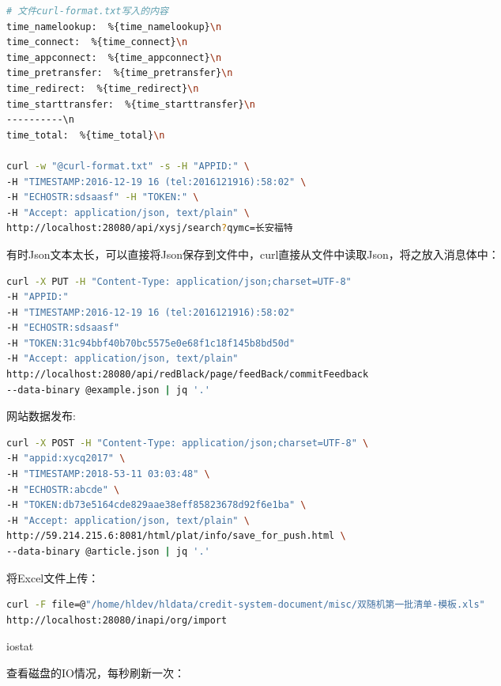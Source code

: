 \documentclass[12pt]{book}
\makeatletter
\numberwithin{dummy}{section}
\theoremstyle{ocrenumbox}
\theoremstyle{blacknumex}
\theoremstyle{blacknumbox}
\theoremstyle{ocrenum}
\renewcommand{\subsection}{\@startsection {subsection}{2}{\z@}
	{-3ex \@plus -0.1ex \@minus -.4ex}
	{0.5ex \@plus.2ex }
	{\normalfont\sffamily\bfseries}}
\makeatother
\begin{document}
\begin{lstlisting}[language=Bash]
# 文件curl-format.txt写入的内容
time_namelookup:  %{time_namelookup}\n
time_connect:  %{time_connect}\n
time_appconnect:  %{time_appconnect}\n
time_pretransfer:  %{time_pretransfer}\n
time_redirect:  %{time_redirect}\n
time_starttransfer:  %{time_starttransfer}\n
----------\n
time_total:  %{time_total}\n

curl -w "@curl-format.txt" -s -H "APPID:" \
-H "TIMESTAMP:2016-12-19 16 (tel:2016121916):58:02" \
-H "ECHOSTR:sdsaasf" -H "TOKEN:" \
-H "Accept: application/json, text/plain" \
http://localhost:28080/api/xysj/search?qymc=长安福特
\end{lstlisting}

有时Json文本太长，可以直接将Json保存到文件中，curl直接从文件中读取Json，将之放入消息体中：

\begin{lstlisting}[language=Bash]
curl -X PUT -H "Content-Type: application/json;charset=UTF-8" 
-H "APPID:"  
-H "TIMESTAMP:2016-12-19 16 (tel:2016121916):58:02"  
-H "ECHOSTR:sdsaasf" 
-H "TOKEN:31c94bbf40b70bc5575e0e68f1c18f145b8bd50d"  
-H "Accept: application/json, text/plain" 
http://localhost:28080/api/redBlack/page/feedBack/commitFeedback 
--data-binary @example.json | jq '.'
\end{lstlisting}

网站数据发布:

\begin{lstlisting}[language=Bash]
curl -X POST -H "Content-Type: application/json;charset=UTF-8" \
-H "appid:xycq2017" \
-H "TIMESTAMP:2018-53-11 03:03:48" \
-H "ECHOSTR:abcde" \
-H "TOKEN:db73e5164cde829aae38eff85823678d92f6e1ba" \
-H "Accept: application/json, text/plain" \
http://59.214.215.6:8081/html/plat/info/save_for_push.html \
--data-binary @article.json | jq '.'
\end{lstlisting}

将Excel文件上传：

\begin{lstlisting}[language=Bash]
curl -F file=@"/home/hldev/hldata/credit-system-document/misc/双随机第一批清单-模板.xls" 
http://localhost:28080/inapi/org/import
\end{lstlisting}



\subsection{iostat}

查看磁盘的IO情况，每秒刷新一次：
\end{document}
